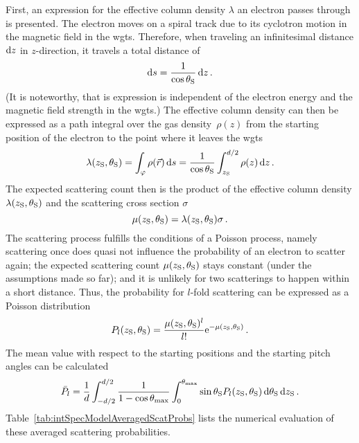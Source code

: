 First, an expression for the effective column density $\lambda$ an electron passes through is presented. The electron moves on a spiral track due to its cyclotron motion in the magnetic field in the \gls{wgts}. Therefore, when traveling an infinitesimal distance $\mathop{}\!\mathrm{d} z$ in $z$-direction, it travels a total distance of
\begin{equation}
\label{eq:intSpecModelInfinitesimalElecPath}
\mathop{}\!\mathrm{d} s = \frac{1}{\cos\theta_\mathrm{S}} \mathop{}\!\mathrm{d} z 
\text{\,.}
\end{equation}
(It is noteworthy, that is expression is independent of the electron energy and the magnetic field strength in the \gls{wgts}.)
The effective column density can then be expressed as a path integral over the gas density~$\rho(z)$ from the starting position of the electron to the point where it leaves the \gls{wgts}
\begin{equation}
\label{eq:intSpecModelEffColumnDensity}
\lambda(z_\mathrm{S},\theta_\mathrm{S}) = 
\int_{\varphi} \rho(\Vec{r})\mathop{}\!\mathrm{d} s =
\frac{1}{\cos\theta_\mathrm{S}}
\int_{z_\mathrm{S}}^{d/2} \rho(z)\mathop{}\!\mathrm{d} z
\text{\,.}
\end{equation}
The expected scattering count then is the product of the effective column density $\lambda(z_\mathrm{S},\theta_\mathrm{S})$ and the scattering cross section $\sigma$~\cite{Groh2015}
\begin{equation}
\label{eq:intSpecModelExpectedScatteringCount}
\mu(z_\mathrm{S}, \theta_\mathrm{S}) = \lambda(z_\mathrm{S},\theta_\mathrm{S}) \sigma \text{\,.}
\end{equation}
The scattering process fulfills the conditions of a Poisson process, namely scattering once does quasi not influence the probability of an electron to scatter again; the expected scattering count $\mu(z_\mathrm{S}, \theta_\mathrm{S})$ stays constant (under the assumptions made so far); and it is unlikely for two scatterings to happen within a short distance. Thus, the probability for $l$-fold scattering can be expressed as a Poisson distribution~\cite{Groh2015}
\begin{equation}
\label{eq:scatProbs}
P_l(z_\mathrm{S}, \theta_\mathrm{S}) = 
\frac{
	\mu(z_\mathrm{S}, \theta_\mathrm{S})^l
}{l!}
\mathrm{e}^{-\mu(z_\mathrm{S}, \theta_\mathrm{S})} \text{\,.}
\end{equation}
The mean value with respect to the starting positions and the starting pitch angles can be calculated~\cite{Groh2015}
\begin{equation}
	\label{eq:intSpecModelAveragedScatProbs}
	\bar{P}_l =
	\frac{1}{d}
	\int_{-d/2}^{d/2}
		\frac{1}{1-\cos\theta_\mathrm{max}}
		\int_{0}^{\theta_\mathrm{max}}
			\sin\theta_\mathrm{S}
			P_l(z_\mathrm{S},\theta_\mathrm{S})
		\mathop{}\!\mathrm{d} \theta_\mathrm{S}
	\mathop{}\!\mathrm{d} z_\mathrm{S}
	\text{\,.}
\end{equation}
Table~\ref{tab:intSpecModelAveragedScatProbs} lists the numerical evaluation of these averaged scattering probabilities.

